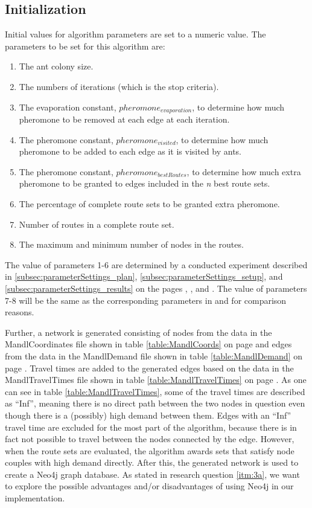 \subsection{Initialization}
Initial values for algorithm parameters are set to a numeric value. The parameters to be set for this algorithm are:
\begin{enumerate}
\item The ant colony size. 
\item The numbers of iterations (which is the stop criteria).
\item The evaporation constant, $pheromone_{evaporation}$, to determine how much pheromone to be removed at each edge at each iteration.
\item The pheromone constant, $pheromone_{visited}$, to determine how much pheromone to be added to each edge as it is visited by ants.
\item The pheromone constant, $pheromone_{bestRoutes}$, to determine how much extra pheromone to be granted to edges included in the \textit{n} best route sets.
\item The percentage of complete route sets to be granted extra pheromone.
\item Number of routes in a complete route set. 
\item The maximum and minimum number of nodes in the routes.
\end{enumerate}
The value of parameters 1-6 are determined by a conducted experiment described in \ref{subsec:parameterSettings_plan}, \ref{subsec:parameterSettings_setup}, and \ref{subsec:parameterSettings_results} on the pages \pageref{subsec:parameterSettings_plan}, \pageref{subsec:parameterSettings_setup}, and \pageref{subsec:parameterSettings_results}. The value of parameters 7-8 will be the same as the corresponding parameters in \citet{kechagiopoulos14} and \citet{nikolic14} for comparison reasons. 

Further, a network is generated consisting of nodes from the data in the MandlCoordinates file shown in table \ref{table:MandlCoords} on page \pageref{table:MandlCoords} and edges from the data in the MandlDemand file shown in table \ref{table:MandlDemand} on page \pageref{table:MandlDemand}. Travel times are added to the generated edges based on the data in the MandlTravelTimes file shown in table \ref{table:MandlTravelTimes} on page \pageref{table:MandlTravelTimes}. As one can see in table \ref{table:MandlTravelTimes}, some of the travel times are described as ``Inf'', meaning there is no direct path between the two nodes in question even though there is a (possibly) high demand between them. Edges with an ``Inf'' travel time are excluded for the most part of the algorithm, because there is in fact not possible to travel between the nodes connected by the edge. However, when the route sets are evaluated, the algorithm awards sets that satisfy node couples with high demand directly. After this, the generated network is used to create a Neo4j graph database. As stated in research question \ref{itm:3a}, we want to explore the possible advantages and/or disadvantages of using Neo4j in our implementation.



